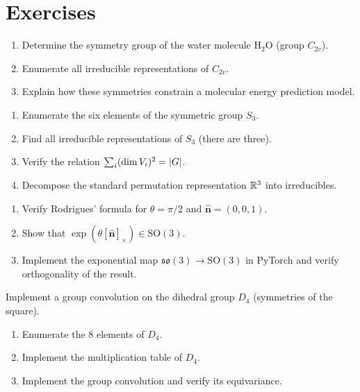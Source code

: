 \section*{Exercises}

\begin{exercise}
\begin{enumerate}
    \item Determine the symmetry group of the water molecule $\mathrm{H_2O}$
          (group $C_{2v}$).
    \item Enumerate all irreducible representations of $C_{2v}$.
    \item Explain how these symmetries constrain a molecular energy prediction model.
\end{enumerate}
\end{exercise}

\begin{exercise}[Representations of $S_3$]
\begin{enumerate}
    \item Enumerate the six elements of the symmetric group $S_3$.
    \item Find all irreducible representations of $S_3$ (there are three).
    \item Verify the relation $\sum_i (\dim V_i)^2 = \left| G \right|$.
    \item Decompose the standard permutation representation $\mathbb{R}^3$ into irreducibles.
\end{enumerate}
\end{exercise}

\begin{exercise}
\begin{enumerate}
    \item Verify Rodrigues' formula for $\theta = \pi/2$ and
          $\hat{\mathbf{n}} = (0, 0, 1)$.
    \item Show that $\exp(\theta [\hat{\mathbf{n}}]_\times) \in \mathrm{SO}(3)$.
    \item Implement the exponential map $\mathfrak{so}(3) \to \mathrm{SO}(3)$ in
          PyTorch and verify orthogonality of the result.
\end{enumerate}
\end{exercise}

\begin{exercise}
Implement a group convolution on the dihedral group $D_4$ (symmetries of
the square).
\begin{enumerate}
    \item Enumerate the 8 elements of $D_4$.
    \item Implement the multiplication table of $D_4$.
    \item Implement the group convolution and verify its equivariance.
\end{enumerate}
\end{exercise}
